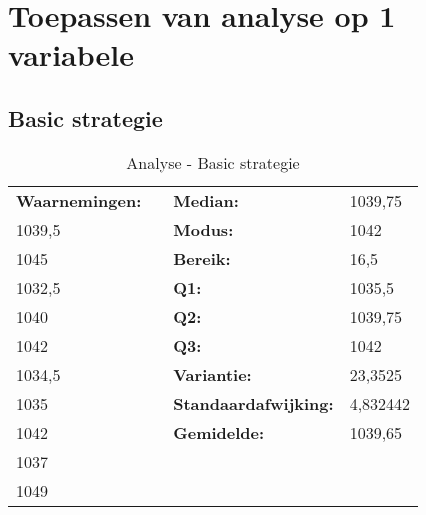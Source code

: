 \documentclass[conference]{IEEEtran}
\begin{document}
\section{Toepassen van analyse op 1 variabele}
\subsection{Basic strategie}

\begin{table}[htbp]
\caption{Analyse - Basic strategie}
\tiny
\centering
\begin{tabular}{|l|lll}
\cline{1-1} \cline{3-4}
\textbf{Waarnemingen:} & \multicolumn{1}{l|}{} & \multicolumn{1}{l|}{\textbf{Median:}} & \multicolumn{1}{l|}{1039,75} \\ \cline{1-1} \cline{3-4} 
1039,5 & \multicolumn{1}{l|}{} & \multicolumn{1}{l|}{\textbf{Modus:}} & \multicolumn{1}{l|}{1042} \\ \cline{1-1} \cline{3-4} 
1045 & \multicolumn{1}{l|}{} & \multicolumn{1}{l|}{\textbf{Bereik:}} & \multicolumn{1}{l|}{16,5} \\ \cline{1-1} \cline{3-4} 
1032,5 & \multicolumn{1}{l|}{} & \multicolumn{1}{l|}{\textbf{Q1:}} & \multicolumn{1}{l|}{1035,5} \\ \cline{1-1} \cline{3-4} 
1040 & \multicolumn{1}{l|}{} & \multicolumn{1}{l|}{\textbf{Q2:}} & \multicolumn{1}{l|}{1039,75} \\ \cline{1-1} \cline{3-4} 
1042 & \multicolumn{1}{l|}{} & \multicolumn{1}{l|}{\textbf{Q3:}} & \multicolumn{1}{l|}{1042} \\ \cline{1-1} \cline{3-4} 
1034,5 & \multicolumn{1}{l|}{} & \multicolumn{1}{l|}{\textbf{Variantie:}} & \multicolumn{1}{l|}{23,3525} \\ \cline{1-1} \cline{3-4} 
1035 & \multicolumn{1}{l|}{} & \multicolumn{1}{l|}{\textbf{Standaardafwijking:}} & \multicolumn{1}{l|}{4,832442} \\ \cline{1-1} \cline{3-4} 
1042 & \multicolumn{1}{l|}{} & \multicolumn{1}{l|}{\textbf{Gemidelde:}} & \multicolumn{1}{l|}{1039,65} \\ \cline{1-1} \cline{3-4} 
1037 &  &  &  \\ \cline{1-1}
1049 &  & \textbf{} &  \\ \cline{1-1}
\end{tabular}
\end{table}
\end{document}
